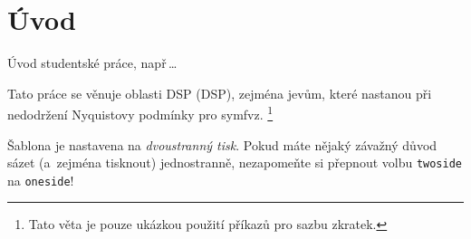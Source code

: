 \chapter*{Úvod}
{}


Úvod studentské práce, např\,\dots

Tato práce se věnuje oblasti \acs{DSP} (\acl{DSP}), zejména jevům, které nastanou při nedodržení Nyquistovy podmínky pro \ac{symfvz}.%
\footnote{Tato věta je pouze ukázkou použití příkazů pro sazbu zkratek.}

Šablona je nastavena na \emph{dvoustranný tisk}. Pokud máte nějaký závažný důvod sázet (a~zejména tisknout) jednostranně, nezapomeňte si přepnout volbu \texttt{twoside} na \texttt{oneside}!